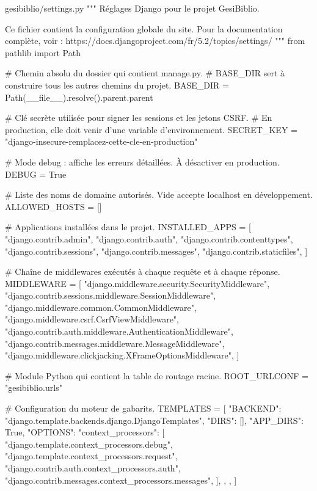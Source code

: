 \begin{codebox}[python]{gesibiblio/settings.py}
"""
Réglages Django pour le projet GesiBiblio.

Ce fichier contient la configuration globale du site.
Pour la documentation complète, voir :
https://docs.djangoproject.com/fr/5.2/topics/settings/
"""
from pathlib import Path

# Chemin absolu du dossier qui contient manage.py.
# BASE_DIR sert à construire tous les autres chemins du projet.
BASE_DIR = Path(__file__).resolve().parent.parent

# Clé secrète utilisée pour signer les sessions et les jetons CSRF.
# En production, elle doit venir d'une variable d'environnement.
SECRET_KEY = "django-insecure-remplacez-cette-cle-en-production"

# Mode debug : affiche les erreurs détaillées. À désactiver en production.
DEBUG = True

# Liste des noms de domaine autorisés. Vide accepte localhost en développement.
ALLOWED_HOSTS = []

# Applications installées dans le projet.
INSTALLED_APPS = [
    "django.contrib.admin",
    "django.contrib.auth",
    "django.contrib.contenttypes",
    "django.contrib.sessions",
    "django.contrib.messages",
    "django.contrib.staticfiles",
]

# Chaîne de middlewares exécutés à chaque requête et à chaque réponse.
MIDDLEWARE = [
    "django.middleware.security.SecurityMiddleware",
    "django.contrib.sessions.middleware.SessionMiddleware",
    "django.middleware.common.CommonMiddleware",
    "django.middleware.csrf.CsrfViewMiddleware",
    "django.contrib.auth.middleware.AuthenticationMiddleware",
    "django.contrib.messages.middleware.MessageMiddleware",
    "django.middleware.clickjacking.XFrameOptionsMiddleware",
]

# Module Python qui contient la table de routage racine.
ROOT_URLCONF = "gesibiblio.urls"

# Configuration du moteur de gabarits.
TEMPLATES = [
    {
        "BACKEND": "django.template.backends.django.DjangoTemplates",
        "DIRS": [],
        "APP_DIRS": True,
        "OPTIONS": {
            "context_processors": [
                "django.template.context_processors.debug",
                "django.template.context_processors.request",
                "django.contrib.auth.context_processors.auth",
                "django.contrib.messages.context_processors.messages",
            ],
        },
    },
]


\end{codebox}
